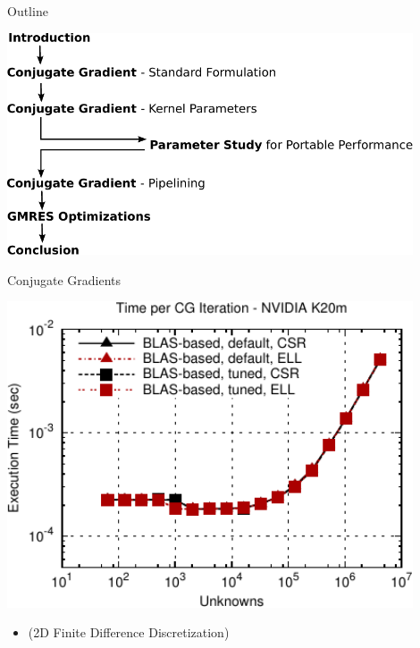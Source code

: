 

\begin{frame}{Outline}
 \begin{center}
  \includegraphics[width=0.9\textwidth]{figures/outline}
 \end{center}
\end{frame}

\begin{frame}[fragile]{Conjugate Gradients}
 \begin{block}{}
 \begin{center}
  \vspace*{-0.5cm}
  \includegraphics[width=0.9\textwidth]{figures/cg-k20m-2}
 \end{center}

 \begin{itemize}
  \item   \vspace*{-0.3cm} {\small (2D Finite Difference Discretization)}
 \end{itemize}
 \end{block}   
\end{frame}

